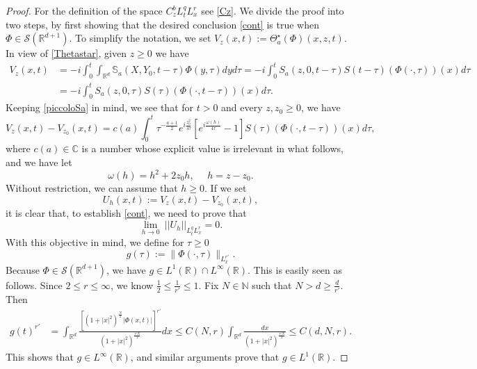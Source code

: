 \documentclass[11pt,letter]{amsart}
\def \R {\mathbb{R}}
\newcommand{\Rd}{\mathbb R^d}
\numberwithin{equation}{section}
\newcommand{\C}{\mathbb{C}}
\numberwithin{equation}{section}
\begin{document}
\begin{proof}
For the definition of the space $C^b_z L^q_t L^r_x$ see \eqref{Cz}. We divide the proof into two steps, by first showing that the desired conclusion \eqref{cont} is true when $\Phi\in \mathscr S(\R^{d+1})$. To simplify the notation, we set $V_z(x,t) := \Theta^\star_a(\Phi)(x,z,t)$. In view of \eqref{Thetastar}, given $z\ge 0$ we have
\begin{align*}
V_z(x,t) & = - i \int_0^{t} \int_{\Rd}  \mathbb S_a(X,Y_0,t-\tau) \Phi(y,\tau) dy d\tau = - i \int_0^{t} S_a(z,0,t-\tau) S(t-\tau)(\Phi(\cdot,\tau))(x) d\tau
\\
& = - i \int_0^{t} S_a(z,0,\tau) S(\tau)(\Phi(\cdot,t-\tau))(x) d\tau.
\end{align*}
Keeping \eqref{piccoloSa} in mind, we see that for $t>0$ and every $z, z_0\ge 0$, we have
\begin{equation}\label{Uz}
V_z(x,t) - V_{z_0}(x,t) = c(a) \int_0^t \tau^{-\frac{a+1}{2}} e^{i\frac{z_0^2}{4\tau}}[e^{i \frac{\omega(h)}{4\tau}} - 1] S(\tau)(\Phi(\cdot,t-\tau))(x) d\tau,
\end{equation}
where $c(a)\in \C$ is a number whose explicit value is irrelevant in what follows, and we have let
\[
\omega(h) = h^2 + 2 z_0 h,\ \ \ \ \ \ h = z-z_0.
\]
Without restriction, we can assume that $h\ge 0$. If we set
\[
U_h(x,t) := V_z(x,t) - V_{z_0}(x,t),
\]
it is clear that, to establish \eqref{cont}, we need to prove that 
\begin{equation}\label{Uh}
\underset{h\to 0}{\lim}\ ||U_h||_{L^q_t L^r_x} = 0.
\end{equation}
With this objective in mind, we define for $\tau\ge 0$
\[
g(\tau):=\|\Phi(\cdot,\tau)\|_{L_x^{r'}}.
\]
Because $\Phi\in\mathscr S(\R^{d+1})$, we have  $g\in L^1(\R)\cap L^\infty(\R)$. This is easily seen as follows. Since $2\le r \le \infty$, we know $\frac 12 \le \frac{1}{r'} \le 1$. Fix $N\in \mathbb N$ such that $N> d\ge \frac{d}{r'}$. Then 
\begin{align*}
g(t)^{r'} & = \int_{\Rd} \frac{\left[(1+|x|^2)^{\frac N2} |\Phi(x,t)|\right]^{r'}}{(1+|x|^2)^{\frac{r' N}{2}}} dx \le C(N,r) \int_{\Rd} \frac{dx}{(1+|x|^2)^{\frac{r' N}{2}}} \le C(d,N,r).
\end{align*}
This shows that $g\in L^\infty(\R)$, and similar arguments prove that $g\in L^1(\R)$. 


\end{proof}
\end{document}
